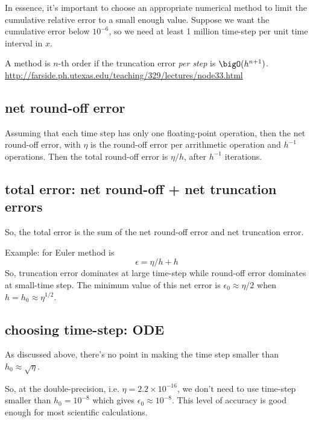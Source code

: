 In essence, it's important to choose an appropriate numerical method to limit
the cumulative relative error to a small enough value. Suppose we want the
cumulative error below $10^{-6}$, so we need at least 1 million time-step per
unit time interval in $x$.
 
\begin{framed}
A method is $n$-th order if the truncation error {\it per step} is
$\bigO(h^{n+1})$.
\url{http://farside.ph.utexas.edu/teaching/329/lectures/node33.html}
\end{framed}

\subsection{net round-off error}

Assuming that each time step has only one floating-point operation, then the net
round-off error, with $\eta$ is the round-off error per arrithmetic operation
and $h^{-1}$ operations. Then the total round-off error is $\eta/h$, after
$h^{-1}$ iterations.

\subsection{total error: net round-off + net truncation errors}
\label{sec:total-error}

So, the total error is the sum of the net round-off error and net truncation
error. 

Example: for Euler method is
\begin{equation}
\epsilon = \eta/h + h
\end{equation}
So, truncation error dominates at large time-step while round-off error
dominates at small-time step. The minimum value of this net error is
$\epsilon_0 \approx \eta/2$ when $h = h_0 \approx \eta^{1/2}$. 

\subsection{choosing time-step: ODE}

As discussed above, there's no point in making the time step smaller than
$h_0 \approx \sqrt{\eta}$.

So, at the double-precision,
i.e. $\eta = 2.2\times 10^{-16}$, we don't need to use time-step smaller than 
$h_0 = 10^{-8}$ which gives $\epsilon_0 \approx 10^{-8}$. This level of accuracy
is good enough for most  scientific calculations. 

